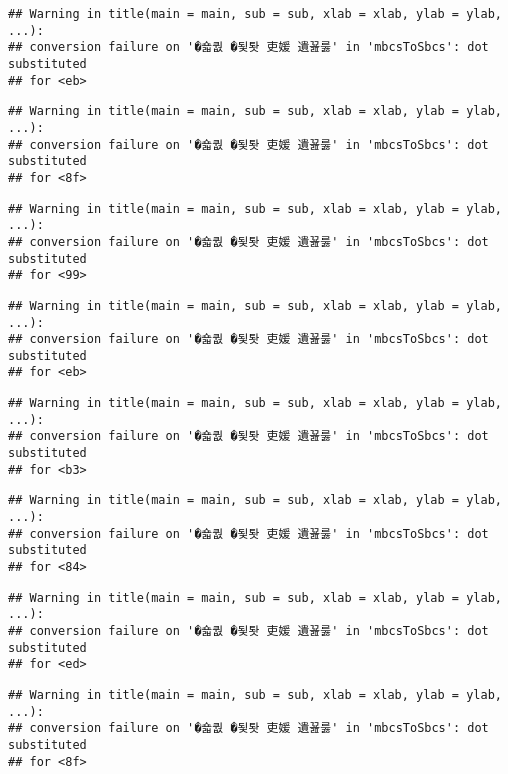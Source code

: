 \documentclass[]{article}
\begin{document}
\begin{verbatim}
## Warning in title(main = main, sub = sub, xlab = xlab, ylab = ylab, ...):
## conversion failure on '�숇퀎 �됯퇏 吏媛 遺꾪룷' in 'mbcsToSbcs': dot substituted
## for <eb>
\end{verbatim}

\begin{verbatim}
## Warning in title(main = main, sub = sub, xlab = xlab, ylab = ylab, ...):
## conversion failure on '�숇퀎 �됯퇏 吏媛 遺꾪룷' in 'mbcsToSbcs': dot substituted
## for <8f>
\end{verbatim}

\begin{verbatim}
## Warning in title(main = main, sub = sub, xlab = xlab, ylab = ylab, ...):
## conversion failure on '�숇퀎 �됯퇏 吏媛 遺꾪룷' in 'mbcsToSbcs': dot substituted
## for <99>
\end{verbatim}

\begin{verbatim}
## Warning in title(main = main, sub = sub, xlab = xlab, ylab = ylab, ...):
## conversion failure on '�숇퀎 �됯퇏 吏媛 遺꾪룷' in 'mbcsToSbcs': dot substituted
## for <eb>
\end{verbatim}

\begin{verbatim}
## Warning in title(main = main, sub = sub, xlab = xlab, ylab = ylab, ...):
## conversion failure on '�숇퀎 �됯퇏 吏媛 遺꾪룷' in 'mbcsToSbcs': dot substituted
## for <b3>
\end{verbatim}

\begin{verbatim}
## Warning in title(main = main, sub = sub, xlab = xlab, ylab = ylab, ...):
## conversion failure on '�숇퀎 �됯퇏 吏媛 遺꾪룷' in 'mbcsToSbcs': dot substituted
## for <84>
\end{verbatim}

\begin{verbatim}
## Warning in title(main = main, sub = sub, xlab = xlab, ylab = ylab, ...):
## conversion failure on '�숇퀎 �됯퇏 吏媛 遺꾪룷' in 'mbcsToSbcs': dot substituted
## for <ed>
\end{verbatim}

\begin{verbatim}
## Warning in title(main = main, sub = sub, xlab = xlab, ylab = ylab, ...):
## conversion failure on '�숇퀎 �됯퇏 吏媛 遺꾪룷' in 'mbcsToSbcs': dot substituted
## for <8f>
\end{verbatim}
\end{document}

